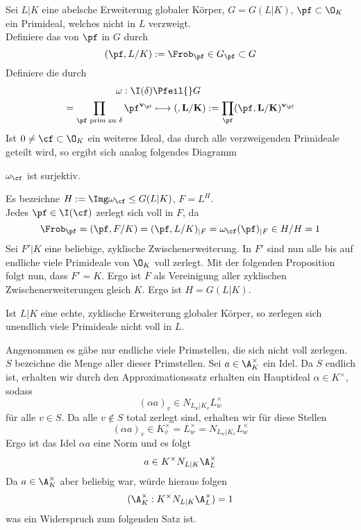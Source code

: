 Sei $L|K$ eine abelsche Erweiterung globaler Körper, $G = G(L|K)$, $\pf \subset \O_K$ ein Primideal, welches nicht in $L$ verzweigt.\\
Definiere das  von $\pf$ in $G$ durch
\[ (\pf, L/K) := \Frob_\pf \in G_\pf \subset G \]
Definiere die  durch
\begin{align*}
\omega : \I(\delta) & \Pfeil{} G\\
\bf = \prod_{\pf \text{ prim zu }\delta} \pf^{v_{\pf}} & \longmapsto (\bf,L/K) := \prod_{\pf} (\pf, L/K)^{v_\pf}
\end{align*}
Ist $0\neq \cf \subset \O_K$ ein weiteres Ideal, das durch alle verzweigenden Primideale geteilt wird, so ergibt sich analog folgendes Diagramm
\begin{center}
\end{center}

\Satz{}
$\omega_\cf$ ist surjektiv.
\begin{Beweis}{}
Es bezeichne $H := \Img \omega_\cf \leq G(L|K)$, $F = L^H$.\\
Jedes $\pf \in \I(\cf)$ zerlegt sich voll in $F$, da
\[ \Frob_\pf =  (\pf, F/K) =(\pf, L/K)_{|F} = \omega_\cf(\pf)_{|F} \in H/H = 1 \]
Sei $F'|K$ eine beliebige, zyklische Zwischenerweiterung. In $F'$ sind nun alle bis auf endliche viele Primideale von $\O_K$ voll zerlegt. Mit der folgenden Proposition folgt nun, dass $F' = K$. Ergo ist $F$ als Vereinigung aller zyklischen Zwischenerweiterungen gleich $K$. Ergo ist $H = G(L|K)$.
\end{Beweis}

\Prop{}
Ist $L|K$ eine echte, zyklische Erweiterung globaler Körper, so zerlegen sich unendlich viele Primideale nicht voll in $L$.

\begin{Beweis}{}
Angenommen es gäbe nur endliche viele Primstellen, die sich nicht voll zerlegen. $S$ bezeichne die Menge aller dieser Primstellen. Sei $a \in \A_K^\times$ ein Idel. Da $S$ endlich ist, erhalten wir durch den Approximationssatz erhalten ein Hauptideal $\alpha \in K^\times$, sodass
\[ (\alpha a)_v \in N_{L_w|K_v}L_w^\times\]
für alle $v \in S$. Da alle $v\notin S$ total zerlegt sind, erhalten wir für diese Stellen
\[ (\alpha a)_v \in K_v^\times = L_w^\times = N_{L_w|K_v}L_w^\times \]
Ergo ist das Idel $\alpha a$ eine Norm und es folgt
\[ a \in K^\times N_{L|K}\A_L^\times \]
Da $a \in \A_K^\times$ aber beliebig war, würde hieraus folgen
\[ (\A_K^\times :K^\times N_{L|K} \A_L^\times  ) = 1\]
was ein Widerspruch zum folgenden Satz ist.  
\end{Beweis}

